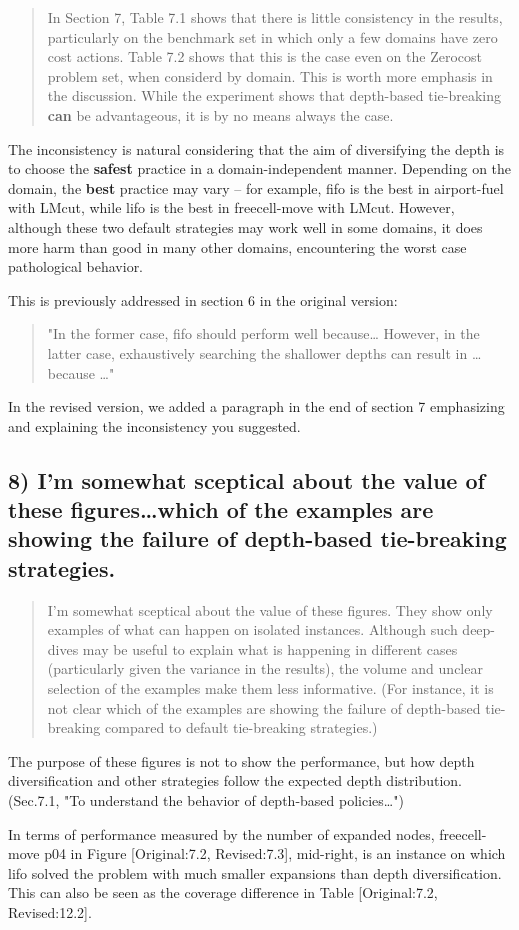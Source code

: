\documentclass{article}
\begin{document}
\begin{quote}
 In Section 7, Table 7.1 shows that there is little consistency in the
results, particularly on the benchmark set in which only a few domains
have zero cost actions. Table 7.2 shows that this is the case even on
the Zerocost problem set, when considerd by domain. This is worth more
emphasis in the discussion. While the experiment shows that
depth-based tie-breaking \textbf{can} be advantageous, it is by no means
always the case.
\end{quote}

The inconsistency is natural considering
that the aim of diversifying the depth is to choose the \textbf{safest} practice in a domain-independent
manner. Depending on the domain, the \textbf{best} practice may vary -- for example, fifo is the best in
airport-fuel with LMcut, while lifo is the best in freecell-move with LMcut.
However, although these two default strategies may work well in some domains,
it does more harm than good in many other domains,
encountering the worst case pathological behavior.

This is previously addressed in section 6 in the original version:

\begin{quote}
"In the former case, fifo should perform well because\ldots{} However, in the latter case, exhaustively
searching the shallower depths can result in \ldots{} because \ldots{}"
\end{quote}

In the revised version,
we added a paragraph in the end of section 7
emphasizing and explaining the inconsistency you suggested.

\subsection{8) I'm somewhat sceptical about the value of these figures\ldots{}which of the examples are showing the failure of depth-based tie-breaking strategies.}
\label{sec:orgheadline32}

\begin{quote}
 I'm somewhat sceptical about the value of these figures. They show
only examples of what can happen on isolated instances. Although such
deep-dives may be useful to explain what is happening in different
cases (particularly given the variance in the results), the volume and
unclear selection of the examples make them less informative. (For
instance, it is not clear which of the examples are showing the
failure of depth-based tie-breaking compared to default tie-breaking
strategies.)
\end{quote}

The purpose of these figures is not to show the performance,
but how depth diversification and other strategies follow the expected depth distribution.
(Sec.7.1, "To understand the behavior of depth-based policies\ldots{}")

In terms of performance measured by the number of expanded nodes,
freecell-move p04 in Figure [Original:7.2, Revised:7.3], mid-right,
is an instance on which lifo solved the problem
with much smaller expansions than depth diversification.
This can also be seen as the coverage difference in Table [Original:7.2, Revised:12.2].
\end{document}
